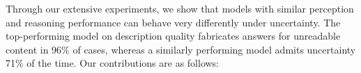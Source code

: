 

Through our extensive experiments,
we show that models with similar perception and reasoning performance can behave very differently under uncertainty. The top-performing model on description quality fabricates answers for unreadable content in 96\% of cases, whereas a similarly performing model admits uncertainty 71\% of the time. Our contributions are as follows:




